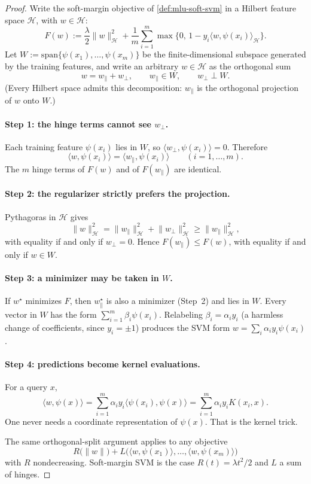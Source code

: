 \begin{proof}
Write the soft-margin objective of \cref{def:mlu-soft-svm} in a Hilbert feature space $\mathcal{H}$, with $w\in\mathcal{H}$:
\[
F(w)
:=
\frac{\lambda}{2}\lVert w\rVert_{\mathcal{H}}^2
+
\frac1m\sum_{i=1}^m\max\bigl\{0,\,1-y_i\langle w,\psi(x_i)\rangle_{\mathcal{H}}\bigr\}.
\]
Let $W:=\mathrm{span}\{\psi(x_1),\dots,\psi(x_m)\}$ be the finite-dimensional subspace generated by the training features, and write an arbitrary $w\in\mathcal{H}$ as the orthogonal sum
\[
w
=
w_{\parallel}+w_{\perp},
\qquad
w_{\parallel}\in W,
\qquad
w_{\perp}\perp W.
\]
(Every Hilbert space admits this decomposition: $w_{\parallel}$ is the orthogonal projection of $w$ onto $W$.)

\paragraph{Step 1: the hinge terms cannot see $w_{\perp}$.}
Each training feature $\psi(x_i)$ lies in $W$, so $\langle w_{\perp},\psi(x_i)\rangle=0$. Therefore
\[
\langle w,\psi(x_i)\rangle
=
\langle w_{\parallel},\psi(x_i)\rangle
\qquad(i=1,\dots,m).
\]
The $m$ hinge terms of $F(w)$ and of $F(w_{\parallel})$ are identical.

\paragraph{Step 2: the regularizer strictly prefers the projection.}
Pythagoras in $\mathcal{H}$ gives
\[
\lVert w\rVert_{\mathcal{H}}^2
=
\lVert w_{\parallel}\rVert_{\mathcal{H}}^2
+
\lVert w_{\perp}\rVert_{\mathcal{H}}^2
\ge
\lVert w_{\parallel}\rVert_{\mathcal{H}}^2,
\]
with equality if and only if $w_{\perp}=0$. Hence $F(w_{\parallel})\le F(w)$, with equality if and only if $w\in W$.

\paragraph{Step 3: a minimizer may be taken in $W$.}
If $w^\star$ minimizes $F$, then $w^\star_{\parallel}$ is also a minimizer (Step~2) and lies in $W$. Every vector in $W$ has the form $\sum_{i=1}^m\beta_i\psi(x_i)$. Relabeling $\beta_i=\alpha_i y_i$ (a harmless change of coefficients, since $y_i=\pm1$) produces the SVM form $w=\sum_i\alpha_i y_i\psi(x_i)$.

\paragraph{Step 4: predictions become kernel evaluations.}
For a query $x$,
\[
\langle w,\psi(x)\rangle
=
\sum_{i=1}^m\alpha_i y_i\langle\psi(x_i),\psi(x)\rangle
=
\sum_{i=1}^m\alpha_i y_i K(x_i,x).
\]
One never needs a coordinate representation of $\psi(x)$. That is the kernel trick.

The same orthogonal-split argument applies to any objective
\[
R\bigl(\lVert w\rVert\bigr)+L\bigl(\langle w,\psi(x_1)\rangle,\dots,\langle w,\psi(x_m)\rangle\bigr)
\]
with $R$ nondecreasing. Soft-margin SVM is the case $R(t)=\lambda t^2/2$ and $L$ a sum of hinges.
\end{proof}

